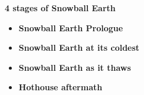 \textbf{4 stages of Snowball Earth}
\begin{itemize}
    \item \textbf{Snowball Earth Prologue}
    \item \textbf{Snowball Earth at its coldest}
    \item \textbf{Snowball Earth as it thaws}
    \item \textbf{Hothouse aftermath}
\end{itemize}


